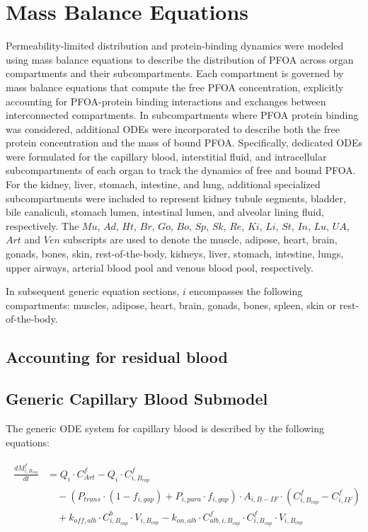 \documentclass[preprint,12pt,authoryear]{elsarticle}
\begin{document}
\section{Mass Balance Equations} 
\label{Appendix:PFOA_mass_balance}
Permeability-limited distribution and protein-binding dynamics were modeled using mass balance equations to describe the distribution of PFOA across organ compartments and their subcompartments. Each compartment is governed by mass balance equations that compute the free PFOA concentration, explicitly accounting for PFOA-protein binding interactions and exchanges between interconnected compartments. In subcompartments where PFOA protein binding was considered, additional ODEs were incorporated to describe both the free protein concentration and the mass of bound PFOA. Specifically, dedicated ODEs were formulated for the capillary blood, interstitial fluid, and intracellular subcompartments of each organ to track the dynamics of free and bound PFOA. For the kidney, liver, stomach, intestine, and lung, additional specialized subcompartments were included to represent kidney tubule segments, bladder, bile canaliculi, stomach lumen, intestinal lumen, and alveolar lining fluid, respectively. The $Mu$, $Ad$, $Ht$, $Br$, $Go$, $Bo$, $Sp$, $Sk$, $Re$, $Ki$, $Li$, $St$, $In$, $Lu$, $UA$, $Art$ and $Ven$ subscripts are used to denote the muscle, adipose, heart, brain, gonads, bones, skin, rest-of-the-body, kidneys, liver, stomach, intestine, lungs, upper airways, arterial blood pool and venous blood pool, respectively.

In subsequent generic equation sections, $i$ encompasses the following compartments: muscles, adipose, heart, brain, gonads, bones, spleen, skin or rest-of-the-body. 
\subsection{Accounting for residual blood}


\subsection{Generic Capillary Blood Submodel}

The generic ODE system for capillary blood is described by the following equations:

\begin{align}
\begin{aligned}
\frac{dM_{i,B_{cap}}^f}{dt} &= Q_i \cdot C_{Art}^f 
- Q_i \cdot C_{i,B_{cap}}^f \\
& \quad - (P_{trans}\cdot  (1-f_{i,gap}) + P_{i,para} \cdot f_{i,gap})   \cdot A_{i,B-IF} \cdot (C_{i,B_{cap}}^f - C_{i,IF}^f) \\
& \quad + k_{off,alb} \cdot C_{i,B_{cap}}^b \cdot V_{i,B_{cap}} 
- k_{on,alb} \cdot C_{alb,i,B_{cap}}^f \cdot C_{i,B_{cap}}^f \cdot V_{i,B_{cap}}
\end{aligned}
\label{eq:PFOA_blood_ODE_free}
\end{align}
\end{document}
